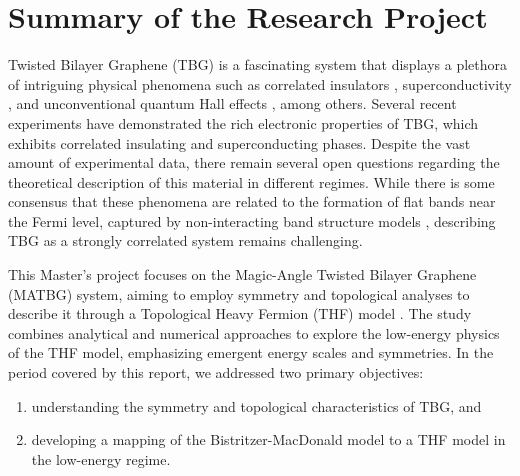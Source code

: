 \documentclass[12pt]{report}
\begin{document}
%
%
\geraTitulo
%
\folhaDeRosto
%
%
%
\tableofcontents
\thispagestyle{empty}
\clearpage
%

\sectionfont{\scshape}



\chapter{Summary of the Research Project} \label{chp:abstract}

Twisted Bilayer Graphene (TBG) is a fascinating system that displays a plethora of intriguing physical phenomena such as correlated insulators \cite{cao2018_correlated}, superconductivity \cite{cao2018}, and unconventional quantum Hall effects \cite{unconv_QHE_tbg_2006}, among others. Several recent experiments have demonstrated the rich electronic properties of TBG, which exhibits correlated insulating and superconducting phases. Despite the vast amount of experimental data, there remain several open questions regarding the theoretical description of this material in different regimes. While there is some consensus that these phenomena are related to the formation of flat bands near the Fermi level, captured by non-interacting band structure models \cite{macdonald2011}, describing TBG as a strongly correlated system remains challenging.

This Master's project focuses on the Magic-Angle Twisted Bilayer Graphene (MATBG) system, aiming to employ symmetry and topological analyses to describe it through a Topological Heavy Fermion (THF) model \cite{topoheavyfermion2022}. The study combines analytical and numerical approaches to explore the low-energy physics of the THF model, emphasizing emergent energy scales and symmetries. In the period covered by this report, we addressed two primary objectives:
\begin{enumerate}[label=(\alph*)]
\item understanding the symmetry and topological characteristics of TBG, and
\item developing a mapping of the Bistritzer-MacDonald model \cite{macdonald2011} to a THF model in the low-energy regime.
\end{enumerate}
\end{document}
